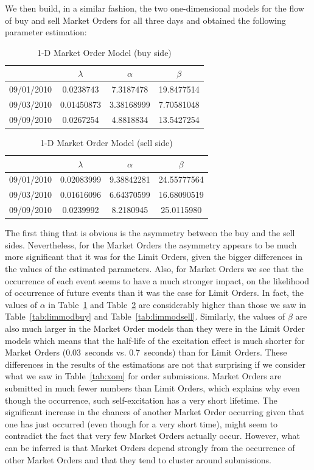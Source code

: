 We then build, in a similar fashion, the two one-dimensional models for the flow of buy and sell Market Orders for all three days and obtained the following parameter estimation: 
	\begin{table}[!htbp]
	\centering
	\caption{1-D Market Order Model (buy side)\label{tab:marketorderbuy}}
	\begin{tabular}{c|ccc} 
		& $\lambda$ & $\alpha$ & $\beta$ \\ \hline
	09/01/2010 & 0.0238743 & 7.3187478 & 19.8477514 \\
	09/03/2010 & 0.01450873 & 3.38168999 & 7.70581048 \\
	09/09/2010 & 0.0267254 & 4.8818834 & 13.5427254
	\end{tabular}
	\end{table}
	\begin{table}[!htbp]
	\centering
	\caption{1-D Market Order Model (sell side)\label{fig:marketordersell}}
	\begin{tabular}{c|ccc} 
		& $\lambda$ & $\alpha$  & $\beta$ \\ \hline
	09/01/2010 & 0.02083999 & 9.38842281 & 24.55777564 \\
	09/03/2010 & 0.01616096 & 6.64370599 & 16.68090519 \\
	09/09/2010 & 0.0239992 & 8.2180945 & 25.0115980
	\end{tabular}
	\end{table}
The first thing that is obvious is the asymmetry between the buy and the sell sides. Nevertheless, for the Market Orders the asymmetry appears to be much more significant that it was for the Limit Orders, given the bigger differences in the values of the estimated parameters. Also, for Market Orders we see that the occurrence of each event seems to have a much stronger impact, on the likelihood of occurrence of future events than it was the case for Limit Orders. In fact, the values of $\alpha$ in Table~\ref{tab:marketorderbuy} and Table~\ref{fig:marketordersell} are considerably higher than those we saw in Table~\ref{tab:limmodbuy} and Table~\ref{tab:limmodsell}. Similarly, the values of $\beta$ are also much larger in the Market Order models than they were in the Limit Order models which means that the half-life of the excitation effect is much shorter for Market Orders (0.03~seconds vs. 0.7~seconds) than for Limit Orders. These differences in the results of the estimations are not that surprising if we consider what we saw in Table~\ref{tab:xom} for order submissions. Market Orders are submitted in much fewer numbers than Limit Orders, which explains why even though the occurrence, such self-excitation has a very short lifetime. The significant increase in the chances of another Market Order occurring given that one has just occurred (even though for a very short time), might seem to contradict the fact that very few Market Orders actually occur. However, what can be inferred is that Market Orders depend strongly from the occurrence of other Market Orders and that they tend to cluster around submissions. \twomedskip



